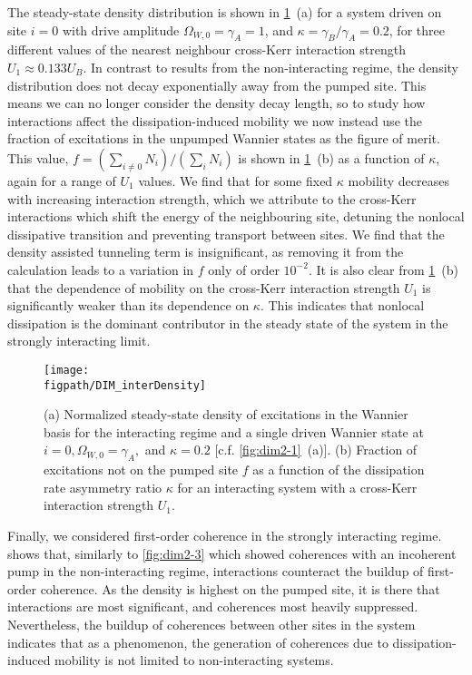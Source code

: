 The steady-state density distribution is shown in \cref{fig:dim3-2}~(a) for a system driven on site \(i=0\) with drive amplitude \(\Omega_{W,0} = \gamma_{A} = 1\), and \(\kappa = \gamma_{B}/\gamma_{A} = 0.2\), for three different values of the nearest neighbour cross-Kerr interaction strength \(U_{1} \approx 0.133U_{B}\). In contrast to results from the non-interacting regime, the density distribution does not decay exponentially away from the pumped site. This means we can no longer consider the density decay length, so to study how interactions affect the dissipation-induced mobility we now instead use the fraction of excitations in the unpumped Wannier states as the figure of merit. This value, \(f = (\sum_{i \neq 0} N_{i}) / (\sum_{i} N_{i})\) is shown in \cref{fig:dim3-2}~(b) as a function of \(\kappa\), again for a range of \(U_{1}\) values. We find that for some fixed \(\kappa\) mobility decreases with increasing interaction strength, which we attribute to the cross-Kerr interactions which shift the energy of the neighbouring site, detuning the nonlocal dissipative transition and preventing transport between sites. We find that the density assisted tunneling term is insignificant, as removing it from the calculation leads to a variation in \(f\) only of order \(10^{-2}\). It is also clear from \cref{fig:dim3-2}~(b) that the dependence of mobility on the cross-Kerr interaction strength \(U_{1}\) is significantly weaker than its dependence on \(\kappa\). This indicates that nonlocal dissipation is the dominant contributor in the steady state of the system in the strongly interacting limit.

\begin{figure}[ht!]
\centering
\texttt{[image: \\figpath/DIM\_interDensity]}
\caption{\label{fig:dim3-2}(a) Normalized steady-state density of excitations in the Wannier basis for the interacting regime and a single driven Wannier state at \(i=0, \Omega_{W,0} = \gamma_{A},\) and \(\kappa = 0.2\) [c.f. \cref{fig:dim2-1}~(a)]. (b) Fraction of excitations not on the pumped site \(f\) as a function of the dissipation rate asymmetry ratio \(\kappa\) for an interacting system with a cross-Kerr interaction strength \(U_{1}\).}
\end{figure}

Finally, we considered first-order coherence in the strongly interacting regime.  shows that, similarly to \cref{fig:dim2-3} which showed coherences with an incoherent pump in the non-interacting regime, interactions counteract the buildup of first-order coherence. As the density is highest on the pumped site, it is there that interactions are most significant, and coherences most heavily suppressed. Nevertheless, the buildup of coherences between other sites in the system indicates that as a phenomenon, the generation of coherences due to dissipation-induced mobility is not limited to non-interacting systems.

